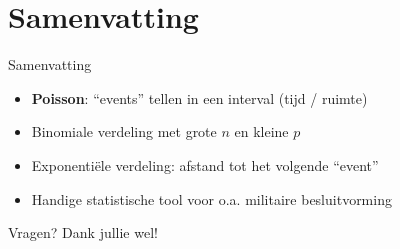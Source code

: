 \documentclass{beamer}
\begin{document}
%	

	\section{Samenvatting}
	
	\begin{frame}{Samenvatting}
		\begin{center}
			\begin{itemize}
				\item \textbf{Poisson}: ``events'' tellen in een interval (tijd / ruimte)
				\item Binomiale verdeling met grote $n$ en kleine $p$
				\item Exponenti\"ele verdeling: afstand tot het volgende ``event''
				\item Handige statistische tool voor o.a. militaire besluitvorming
			\end{itemize}\pause
		\end{center}
		\vfill
		\Huge\centering Vragen?\pause
		\vfill
		\Huge\centering Dank jullie wel!	
	\end{frame}
\end{document}
